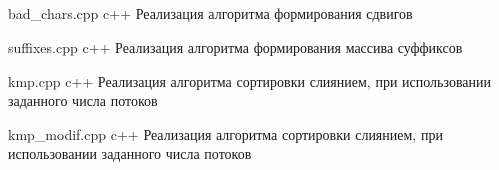 \begin{appendices}
	\chapter{}
	{bad_chars.cpp}
	{c++}
	{Реализация алгоритма формирования сдвигов} 
	
	{suffixes.cpp}
	{c++} 
	{Реализация алгоритма формирования массива суффиксов}
	
	{kmp.cpp}
	{c++}
	{Реализация алгоритма сортировки слиянием, при использовании заданного числа потоков} 
	
	{kmp_modif.cpp}
	{c++}
	{Реализация алгоритма сортировки слиянием, при использовании заданного числа потоков}
\end{appendices}